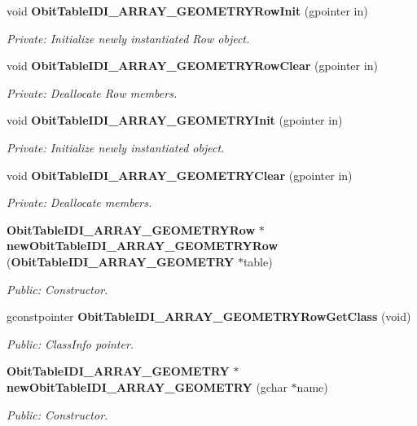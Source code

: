 \begin{CompactItemize}
\item 
void {\bf Obit\-Table\-IDI\_\-ARRAY\_\-GEOMETRYRow\-Init} (gpointer in)
\begin{CompactList}\small\item\em Private: Initialize newly instantiated Row object. \item\end{CompactList}\item 
void {\bf Obit\-Table\-IDI\_\-ARRAY\_\-GEOMETRYRow\-Clear} (gpointer in)
\begin{CompactList}\small\item\em Private: Deallocate Row members. \item\end{CompactList}\item 
void {\bf Obit\-Table\-IDI\_\-ARRAY\_\-GEOMETRYInit} (gpointer in)
\begin{CompactList}\small\item\em Private: Initialize newly instantiated object. \item\end{CompactList}\item 
void {\bf Obit\-Table\-IDI\_\-ARRAY\_\-GEOMETRYClear} (gpointer in)
\begin{CompactList}\small\item\em Private: Deallocate members. \item\end{CompactList}\item 
{\bf Obit\-Table\-IDI\_\-ARRAY\_\-GEOMETRYRow} $\ast$ {\bf new\-Obit\-Table\-IDI\_\-ARRAY\_\-GEOMETRYRow} ({\bf Obit\-Table\-IDI\_\-ARRAY\_\-GEOMETRY} $\ast$table)
\begin{CompactList}\small\item\em Public: Constructor. \item\end{CompactList}\item 
gconstpointer {\bf Obit\-Table\-IDI\_\-ARRAY\_\-GEOMETRYRow\-Get\-Class} (void)
\begin{CompactList}\small\item\em Public: Class\-Info pointer. \item\end{CompactList}\item 
{\bf Obit\-Table\-IDI\_\-ARRAY\_\-GEOMETRY} $\ast$ {\bf new\-Obit\-Table\-IDI\_\-ARRAY\_\-GEOMETRY} (gchar $\ast$name)
\begin{CompactList}\small\item\em Public: Constructor. \item\end{CompactList}\item 

\end{CompactItemize}
